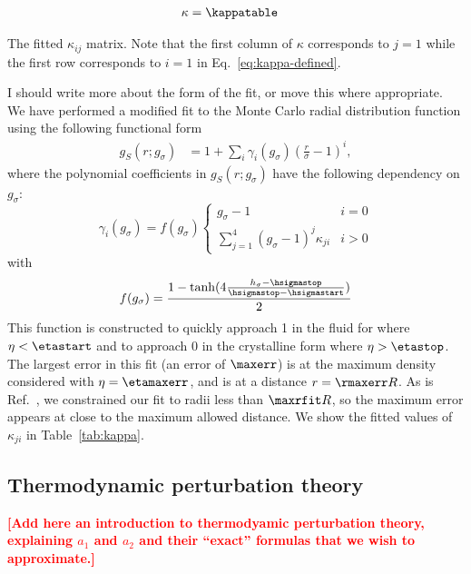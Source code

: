 \documentclass[letterpaper,twocolumn,amsmath,amssymb,pre,aps,10pt]{revtex4-1}
\newcommand\fixme[1]{\textcolor{red}{\textbf{[#1]}}}
\begin{document}


\begin{table}
  \begin{align*}
    \kappa &= \kappatable
  \end{align*}
  \caption{The fitted $\kappa_{ij}$ matrix.  Note that the first
    column of $\kappa$ corresponds to $j=1$ while the first row
    corresponds to $i=1$ in Eq.~\ref{eq:kappa-defined}.  }\label{tab:kappa}
\end{table}

I should write more about the form of the fit, or move this where
appropriate.  We have performed a modified fit to the Monte Carlo
radial distribution function using the following functional form
\begin{align}
  g_S(r;g_\sigma) &=  1 + \sum_i \gamma_i(g_\sigma) \left(\frac{r}{\sigma}-1\right)^i,
  \label{eq:new-fit-form}
\end{align}
where the polynomial coefficients in $g_S(r;g_\sigma)$ have the
following dependency on $g_\sigma$:
\begin{equation}
  \gamma_i(g_\sigma) = f(g_\sigma)
  \begin{cases}
    \displaystyle
    g_\sigma - 1 & i = 0 \\
    \displaystyle
    \sum_{j=1}^{4} (g_\sigma
    - 1)^j \kappa_{ji} & i > 0 \label{eq:kappa-defined}
  \end{cases}
\end{equation}
with
\begin{equation}
  f(g_\sigma) = \frac{1 - \tanh(4 \frac{h_\sigma -
      \hsigmastop}{\hsigmastop - \hsigmastart})}{2}
\end{equation}
This function is constructed to quickly approach 1 in the fluid for
where $\eta < \etastart$ and to approach 0 in the crystalline form
where $\eta > \etastop$.  The largest error in this fit (an error of
$\maxerr$) is at the maximum density considered with $\eta =
\etamaxerr$, and is at a distance $r = \rmaxerr R$.  As is
Ref.~, we constrained our fit to radii less
than $\maxrfit R$, so the maximum error appears at close to the
maximum allowed distance.  We show the fitted values of $\kappa_{ji}$
in Table~\ref{tab:kappa}.

\subsection{Thermodynamic perturbation theory}

\fixme{Add here an introduction to thermodyamic perturbation theory,
  explaining $a_1$ and $a_2$ and their ``exact'' formulas that we wish
  to approximate.}
\end{document}
